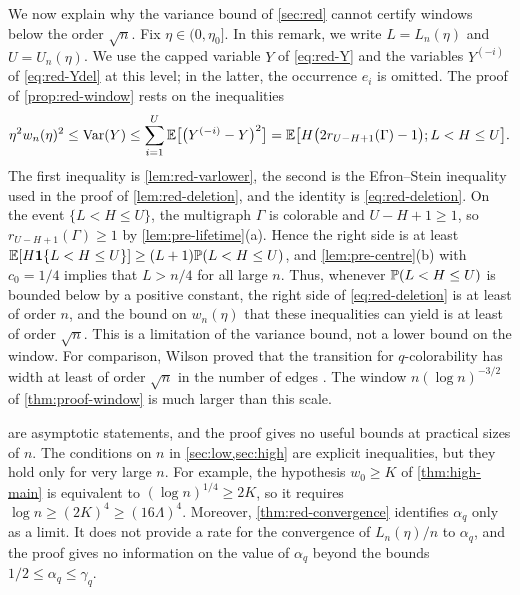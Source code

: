 \begin{remark}\label{rem:proof-sqrt}
We now explain why the variance bound of \cref{sec:red} cannot certify windows below the order $\sqrt n$. Fix $\eta \in (0, \eta_0]$. In this remark, we write $L = L_n(\eta)$ and $U = U_n(\eta)$. We use the capped variable $Y$ of \eqref{eq:red-Y} and the variables $Y^{(-i)}$ of \eqref{eq:red-Ydel} at this level; in the latter, the occurrence $e_i$ is omitted. The proof of \cref{prop:red-window} rests on the inequalities
\[
\eta^2 w_n(\eta)^2 \le \operatorname{Var}(Y) \le \sum_{i = 1}^U \mathbb E \bigl[ \bigl( Y^{(-i)} - Y \bigr)^2 \bigr] = \mathbb E \bigl[ H \bigl( 2 r_{U - H + 1}(\Gamma) - 1 \bigr); L < H \le U \bigr].
\]
The first inequality is \cref{lem:red-varlower}, the second is the Efron--Stein inequality used in the proof of \cref{lem:red-deletion}, and the identity is \eqref{eq:red-deletion}. On the event $\{ L < H \le U \}$, the multigraph $\Gamma$ is colorable and $U - H + 1 \ge 1$, so $r_{U - H + 1}(\Gamma) \ge 1$ by \cref{lem:pre-lifetime}(a). Hence the right side is at least $\mathbb E [H \mathbf 1 \{ L < H \le U \}] \ge (L + 1) \mathbb P(L < H \le U)$, and \cref{lem:pre-centre}(b) with $c_0 = 1/4$ implies that $L > n/4$ for all large $n$. Thus, whenever $\mathbb P(L < H \le U)$ is bounded below by a positive constant, the right side of \eqref{eq:red-deletion} is at least of order $n$, and the bound on $w_n(\eta)$ that these inequalities can yield is at least of order $\sqrt n$. This is a limitation of the variance bound, not a lower bound on the window. For comparison, Wilson proved that the transition for $q$-colorability has width at least of order $\sqrt n$ in the number of edges \cite[Corollary~6]{wilson2002critical}. The window $n (\log n)^{-3/2}$ of \cref{thm:proof-window} is much larger than this scale.
\end{remark}

\begin{remark}\label{rem:proof-finite}
 are asymptotic statements, and the proof gives no useful bounds at practical sizes of $n$. The conditions on $n$ in \cref{sec:low,sec:high} are explicit inequalities, but they hold only for very large $n$. For example, the hypothesis $w_0 \ge K$ of \cref{thm:high-main} is equivalent to $(\log n)^{1/4} \ge 2K$, so it requires $\log n \ge (2K)^4 \ge (16 \Lambda)^4$. Moreover, \cref{thm:red-convergence} identifies $\alpha_q$ only as a limit. It does not provide a rate for the convergence of $L_n(\eta)/n$ to $\alpha_q$, and the proof gives no information on the value of $\alpha_q$ beyond the bounds $1/2 \le \alpha_q \le \gamma_q$.
\end{remark}
